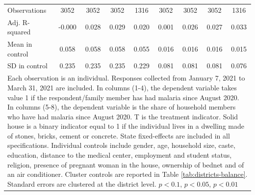 {{\begin{tabular}{l*{8}{c}}
\hline
Observations    &\num{3052}         &\num{3052}         &\num{3052}         &\num{1316}         &\num{3052}         &\num{3052}         &\num{3052}         &\num{1316}         \\
Adj. R-squared  &   -0.000         &    0.028         &    0.029         &    0.020         &    0.001         &    0.026         &    0.027         &    0.033         \\
Mean in control &    0.058         &    0.058         &    0.058         &    0.055         &    0.016         &    0.016         &    0.016         &    0.015         \\
SD in control   &    0.235         &    0.235         &    0.235         &    0.229         &    0.081         &    0.081         &    0.081         &    0.076         \\
\hline\hline
\multicolumn{9}{p{.97\linewidth}}{\scriptsize Each observation is an individual. Responses collected from January 7, 2021 to March 31, 2021 are included. In columns (1-4), the dependent variable takes value 1 if the respondent/family member has had malaria since August 2020. In columns (5-8), the dependent variable is the share of household members who have had malaria since August 2020. T is the treatment indicator. Solid house is a binary indicator equal to 1 if the individual lives in a dwelling made of stones, bricks, cement or concrete. State fixed-effects are included in all specifications. Individual controls include gender, age, household size, caste, education, distance to the medical center, employment and student status, religion, presence of pregnant woman in the house, ownership of bednet and of an air conditioner. Cluster controls are reported in Table \ref{tab:districts-balance}. Standard errors are clustered at the district level. \sym{*} \(p<0.1\), \sym{**} \(p<0.05\), \sym{***} \(p<0.01\)}\\
\end{tabular}
}%

}
